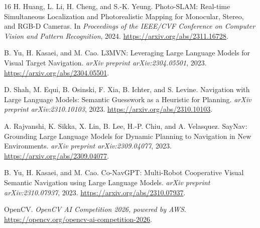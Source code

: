 \documentclass[10pt,a4paper]{article}
\begin{document}
\begin{thebibliography}{16}
H. Huang, L. Li, H. Cheng, and S.-K. Yeung. Photo-SLAM: Real-time Simultaneous Localization and Photorealistic Mapping for Monocular, Stereo, and RGB-D Cameras.
In \emph{Proceedings of the IEEE/CVF Conference on Computer Vision and Pattern Recognition}, 2024. \url{https://arxiv.org/abs/2311.16728}.

B. Yu, H. Kasaei, and M. Cao. L3MVN: Leveraging Large Language Models for Visual Target Navigation.
\emph{arXiv preprint arXiv:2304.05501}, 2023. \url{https://arxiv.org/abs/2304.05501}.

D. Shah, M. Equi, B. Osinski, F. Xia, B. Ichter, and S. Levine. Navigation with Large Language Models: Semantic Guesswork as a Heuristic for Planning.
\emph{arXiv preprint arXiv:2310.10103}, 2023. \url{https://arxiv.org/abs/2310.10103}.

A. Rajvanshi, K. Sikka, X. Lin, B. Lee, H.-P. Chiu, and A. Velasquez. SayNav: Grounding Large Language Models for Dynamic Planning to Navigation in New Environments.
\emph{arXiv preprint arXiv:2309.04077}, 2023. \url{https://arxiv.org/abs/2309.04077}.

B. Yu, H. Kasaei, and M. Cao. Co-NavGPT: Multi-Robot Cooperative Visual Semantic Navigation using Large Language Models.
\emph{arXiv preprint arXiv:2310.07937}, 2023. \url{https://arxiv.org/abs/2310.07937}.

OpenCV. \emph{OpenCV AI Competition 2026, powered by AWS}. \url{https://opencv.org/opencv-ai-competition-2026}.
\end{thebibliography}
\end{document}
